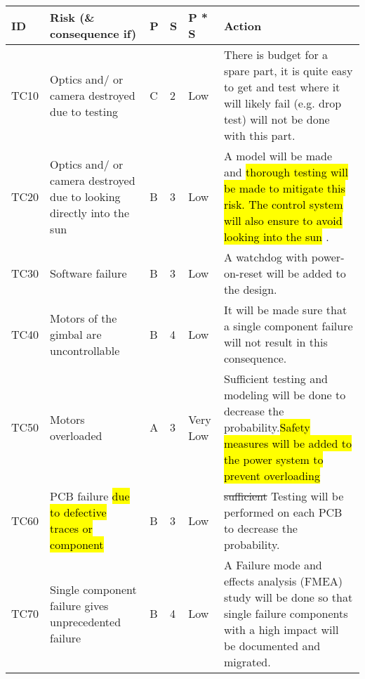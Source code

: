 

\begin{longtable}{|m{}| m{} |m{} |m{}|m{}| m{}|}

\hline
\textbf{ID} & \textbf{Risk (\& consequence if)} & \textbf{P} & \textbf{S} & \textbf{P * S} & \textbf{Action} \\ \hline


TC10 & Optics and/ or camera destroyed due to testing						& C & 2 & \cellcolor[HTML]{FCFF2F}Low 		& There is budget for a spare part, it is quite easy to get and test where it will likely fail (e.g. drop test) will not be done with this part.\\\hline

TC20 & Optics and/ or camera destroyed due to looking directly into the sun & B & 3 & \cellcolor[HTML]{FCFF2F}Low 		& A model will be made and \hl{thorough testing will be made to mitigate this risk. The control system will also ensure to avoid looking into the sun }.\\\hline

TC30 & Software failure														& B & 3 & \cellcolor[HTML]{FCFF2F}Low 		& A watchdog with power-on-reset will be added to the design.\\\hline

TC40 & Motors of the gimbal are uncontrollable								& B & 4 & \cellcolor[HTML]{FCFF2F}Low 		& It will be made sure that a single component failure will not result in this consequence.\\\hline

TC50 & Motors overloaded													& A & 3 & \cellcolor[HTML]{34FF34}Very Low 	& Sufficient testing and modeling will be done to decrease the probability.\hl{Safety measures will be added to the power system to prevent overloading}\\\hline

TC60 & PCB failure \hl{due to defective traces or component}												& B & 3 & \cellcolor[HTML]{FCFF2F}Low 		& \st{sufficient} Testing will be performed on each PCB to decrease the probability.\\\hline

TC70 & Single component failure gives unprecedented failure					& B & 4 & \cellcolor[HTML]{FCFF2F}Low			& A Failure mode and effects analysis (FMEA) study will be done so that single failure components with a high impact will be documented and migrated.\\\hline


\end{longtable}
